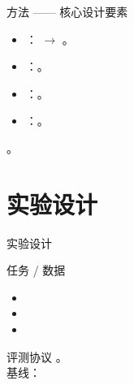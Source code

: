 
\begin{frame}{方法 —— 核心设计要素}
  \begin{itemize}
    \item {}： $\to$ 。
    \item {}：。
    \item {}：。
    \item {}：。
  \end{itemize}
  \tightgap
  \begin{callout}[要点]
    。
  \end{callout}
\end{frame}

\renewcommand{\secblurb}{\ph{本节一句话主旨：任务范围与评测协议}}
\section{实验设计}

\begin{frame}{实验设计}
  \begin{block}{任务 / 数据}
    \begin{itemize}
      \setlength{\itemsep}{0.3em}
      \item {}
      \item {}
      \item {}
    \end{itemize}
  \end{block}
  \tightgap
  \begin{exampleblock}{评测协议}
    \small {}。\\[0.15em]
    {\footnotesize\color{sustechgrey} 基线：}
  \end{exampleblock}
\end{frame}


